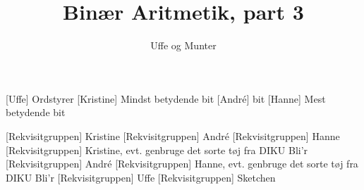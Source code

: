 \documentclass[a4paper,11pt]{article}
\title{Binær Aritmetik, part 3}
\author{Uffe og Munter}
\begin{document}
\maketitle

\begin{roles}
[Uffe] Ordstyrer
[Kristine] Mindst betydende bit
[André] bit
[Hanne] Mest betydende bit
\end{roles}

\begin{props}
[Rekvisitgruppen] Kristine
[Rekvisitgruppen] André
[Rekvisitgruppen] Hanne
[Rekvisitgruppen] Kristine, evt. genbruge det
sorte tøj fra DIKU Bli'r
[Rekvisitgruppen] André
[Rekvisitgruppen] Hanne, evt. genbruge det
sorte tøj fra DIKU Bli'r
[Rekvisitgruppen] Uffe
[Rekvisitgruppen] Sketchen
\end{props}
\end{document}
